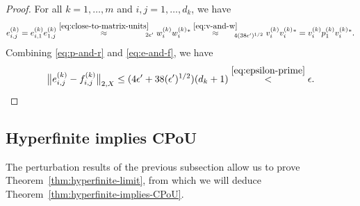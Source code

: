 \documentclass[a4paper,11pt]{amsart}
\theoremstyle{definition}
\numberwithin{equation}{section}
\numberwithin{theorem}{section}
\begin{document}
\begin{proof}
	For all $k = 1, \ldots, m$ and $i, j = 1, \ldots, d_k$, we have
	\begin{equation}\label{eq:e-and-f}
		e_{i, j}^{(k)} = e_{i, 1}^{(k)} e_{1, j}^{(k)} \stackrel{\eqref{eq:close-to-matrix-units}}{\approx}_{\!\!\!2\epsilon'} w_{i}^{(k)} w_{i}^{(k)}{}^* \stackrel{\eqref{eq:v-and-w}}{\approx}_{\!\!\!4(38\epsilon')^{1/2}} v_{i}^{(k)}v_{i}^{(k)}{}^* = v_{i}^{(k)} p_{1}^{(k)} v_{i}^{(k)}{}^*.
	\end{equation}
	Combining \eqref{eq:p-and-r} and \eqref{eq:e-and-f}, we have
	\begin{equation}
		\big\| e_{i, j}^{(k)} - f_{i, j}^{(k)} \big\|_{2, X} \leq (4 \epsilon' + 38 (\epsilon')^{1/2})(d_k + 1) \stackrel{\eqref{eq:epsilon-prime}}{<} \epsilon. \qedhere
	\end{equation}
\end{proof}

\subsection{Hyperfinite implies CPoU}\label{sec:hyp-fin-proofs}

The perturbation results of the previous subsection allow us to prove Theorem~\ref{thm:hyperfinite-limit}, from which we will deduce Theorem~\ref{thm:hyperfinite-implies-CPoU}.
\end{document}
